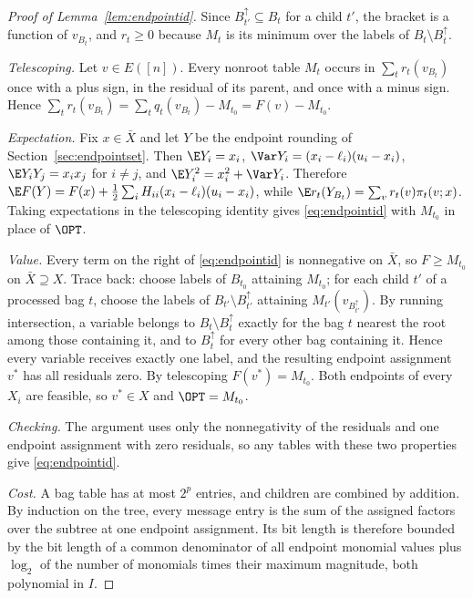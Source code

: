 \begin{proof}[Proof of Lemma~\ref{lem:endpointid}]
Since $B_{t'}^{\uparrow}\subseteq B_t$ for a child $t'$, the bracket is a
function of $v_{B_t}$, and $r_t\ge0$ because $M_t$ is its minimum over the
labels of $B_t\setminus B_t^\uparrow$.

\emph{Telescoping.} Let $v\in E([n])$. Every nonroot table $M_t$ occurs in
$\sum_tr_t(v_{B_t})$ once with a plus sign, in the residual of its parent, and
once with a minus sign. Hence $\sum_tr_t(v_{B_t})=\sum_tq_t(v_{B_t})-M_{t_0}
=F(v)-M_{t_0}$.

\emph{Expectation.} Fix $x\in\bar X$ and let $Y$ be the endpoint rounding
of Section~\ref{sec:endpointset}. Then $\E Y_i=x_i$,
$\Var Y_i=(x_i-\ell_i)(u_i-x_i)$, $\E Y_iY_j=x_ix_j$ for $i\ne j$,
and $\E Y_i^2=x_i^2+\Var Y_i$. Therefore
$\E F(Y)=F(x)+\frac12\sum_iH_{ii}(x_i-\ell_i)(u_i-x_i)$, while
$\E r_t(Y_{B_t})=\sum_vr_t(v)\pi_t(v;x)$. Taking expectations in the
telescoping identity gives \eqref{eq:endpointid} with $M_{t_0}$ in place
of $\OPT$.

\emph{Value.} Every term on the right of \eqref{eq:endpointid} is
nonnegative on $\bar X$, so $F\ge M_{t_0}$ on $\bar X\supseteq X$. Trace back:
choose labels of $B_{t_0}$ attaining $M_{t_0}$; for each child $t'$ of a
processed bag $t$, choose the labels of $B_{t'}\setminus B_{t'}^\uparrow$
attaining $M_{t'}(v_{B_{t'}^\uparrow})$. By running intersection, a variable
belongs to $B_t\setminus B_t^\uparrow$ exactly for the bag $t$ nearest the
root among those containing it, and to $B_{t}^{\uparrow}$ for every other bag
containing it. Hence every variable receives exactly one label, and the
resulting endpoint assignment $v^*$ has all residuals zero. By telescoping
$F(v^*)=M_{t_0}$. Both endpoints of every $X_i$ are feasible, so $v^*\in X$
and $\OPT=M_{t_0}$.

\emph{Checking.} The argument uses only the nonnegativity of the residuals
and one endpoint assignment with zero residuals, so any tables with these two
properties give \eqref{eq:endpointid}.

\emph{Cost.} A bag table has at most $2^p$ entries, and children are combined
by addition. By induction on the tree, every message entry is the sum of the
assigned factors over the subtree at one endpoint assignment. Its bit length
is therefore bounded by the bit length of a common denominator of all endpoint
monomial values plus $\log_2$ of the number of monomials times their maximum
magnitude, both polynomial in $I$.
\end{proof}

